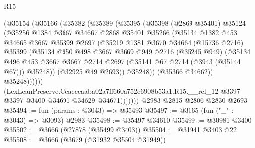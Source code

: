 \begin{lexlean}{R15}
\begin{coremodule}
                  (@35154
                    (@35166
                      (@35382
                        (@35389
                          (@35395
                            (@35398
                              (@2869 @35401)
                              @35124
                              (@35256
                                @1384
                                @3667
                                @34667
                                @2868
                                @35401
                                @35266
                                (@35134
                                  @1382
                                  @453
                                  @34665
                                  @3667
                                  @35399
                                  @2697
                                  (@35219
                                    @1381
                                    @3670
                                    @34664
                                    (@15736 @2716)
                                    @35399
                                    (@35134
                                      @950
                                      @498
                                      @3667
                                      @3669
                                      @949
                                      @2716
                                      (@35245 @949)
                                      (@35134
                                        @496
                                        @453
                                        @3667
                                        @3667
                                        @2714
                                        @2697
                                        (@35141 @67 @2714 (@3943 (@35144 @67)))
                                        @35248))
                                    (@32925 @49 @2693))
                                  @35248))
                              (@35366 @34662))
                            @35248))))))
                (LexLeanPreserve.Ccaeccaaba02a7ff660a752e6908b53a1.R15.__rel_12
                  @3397
                  @3397
                  @3400
                  @34691
                  @34629
                  @34671)))))))
    @2983
    @2815
    @2806
    @2830
    @2693
@35494 := fun (params : @3043) => @35493
@35497 := @3065 (fun ("_" : @3043) => @3093) @2983
@35498 := @35497 @34610
@35499 := @30981 @3400
@35502 := @3666 (@27878 (@35499 @3403))
@35504 := @31941 @3403 @22
@35508 := @3666 (@3679 (@31932 @35504 @31949))

\end{coremodule}
\end{lexlean}
